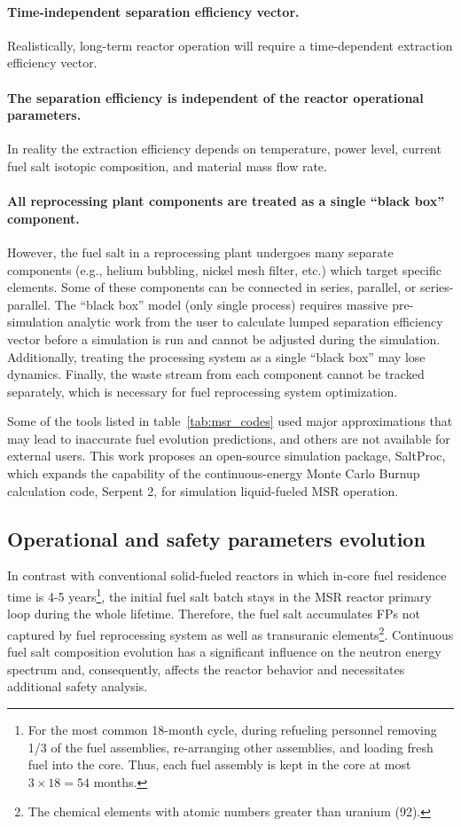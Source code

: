 \paragraph{Time-independent separation efficiency vector.} Realistically, 
	long-term reactor operation will require a time-dependent extraction 
	efficiency vector.
\paragraph{The separation efficiency is independent of the reactor operational 
	parameters.} In reality the extraction efficiency depends on temperature, 
	power level, current fuel salt isotopic composition, and material mass 
	flow rate.
\paragraph{All reprocessing plant components are treated as a single ``black 
box'' component.} However, the fuel salt in a reprocessing plant undergoes 
many separate components (e.g., helium bubbling, nickel mesh filter, etc.) 
which target specific elements. Some of these components can be connected in 
series, parallel, or series-parallel. The ``black box'' model (only single 
process) requires massive pre-simulation analytic work from the user to 
calculate lumped separation efficiency vector before a simulation is run and 
cannot be adjusted during the simulation. Additionally, treating the 
processing system as a single ``black box'' may lose dynamics. Finally, the 
waste stream from each component cannot be tracked separately, which is 
necessary for fuel reprocessing system optimization.

Some of the tools listed in table~\ref{tab:msr_codes} used major 
approximations that may lead to inaccurate fuel evolution predictions, and 
others are not available for external users. This work proposes an open-source 
simulation package, SaltProc, which expands the capability of the 
continuous-energy Monte Carlo Burnup calculation code, Serpent 2, for 
simulation liquid-fueled \gls{MSR} operation.

\subsection{Operational and safety parameters evolution}
In contrast with conventional solid-fueled reactors in which in-core fuel 
residence time is 4-5 years\footnote{For the most common 
18-month cycle, during refueling personnel removing 1/3 of the fuel 
assemblies, re-arranging other assemblies, and loading fresh fuel into the 
core. Thus, each fuel assembly is kept in the core at most $3\times 18=54$ 
months.}, the initial fuel salt batch stays in the \gls{MSR} reactor primary 
loop during the whole lifetime. Therefore, the fuel salt accumulates 
\glspl{FP} not captured by fuel reprocessing system as well as transuranic 
elements\footnote{The chemical elements with atomic numbers greater than 
uranium (92).}. Continuous fuel salt composition evolution has a 
significant influence on the neutron energy spectrum and, consequently, 
affects the reactor behavior and necessitates additional safety analysis.

